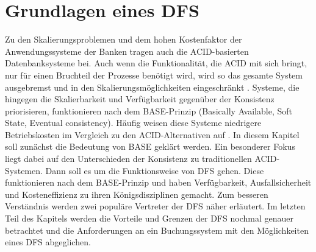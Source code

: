 \documentclass[12pt,oneside,a4paper,parskip]{scrbook}
\begin{document}
\cleardoublepage
\chapter{Grundlagen eines DFS}
\label{basicdfs}
Zu den Skalierungsproblemen und dem hohen Kostenfaktor der Anwendungssysteme der Banken tragen auch die ACID-basierten Datenbanksysteme bei. Auch wenn die Funktionalität, die ACID mit sich bringt, nur für einen Bruchteil der Prozesse benötigt wird, wird so das gesamte System ausgebremst und in den Skalierungsmöglichkeiten eingeschränkt \cite{salt}.
Systeme, die hingegen die Skalierbarkeit und Verfügbarkeit gegenüber der Konsistenz priorisieren, funktionieren nach dem BASE-Prinzip (Basically Available, Soft State, Eventual consistency). Häufig weisen diese Systeme niedrigere Betriebskosten im Vergleich zu den ACID-Alternativen auf \cite{clusterBASE}.
In diesem Kapitel soll zunächst die Bedeutung von BASE geklärt werden. Ein besonderer Fokus liegt dabei auf den Unterschieden der Konsistenz zu traditionellen ACID-Systemen. Dann soll es um die Funktionsweise von DFS gehen. Diese funktionieren nach dem BASE-Prinzip und haben Verfügbarkeit, Ausfallsicherheit und Kosteneffizienz zu ihren Königsdisziplinen gemacht. Zum besseren Verständnis werden zwei populäre Vertreter der DFS näher erläutert. Im letzten Teil des Kapitels werden die Vorteile und Grenzen der DFS nochmal genauer betrachtet und die Anforderungen an ein Buchungssystem mit den Möglichkeiten eines DFS abgeglichen.
\end{document}
